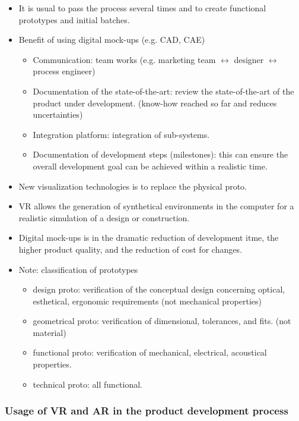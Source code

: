 \documentclass{standalone}
\begin{document}
\begin{itemize}
	\item It is usual to pass the process several times and to create functional prototypes and initial batches.
	\item Benefit of using digital mock-ups (e.g. CAD, CAE)
		\begin{itemize}
			\item Communication: team works (e.g. marketing team $\leftrightarrow$ designer $\leftrightarrow$ process engineer)
			\item Documentation of the state-of-the-art: review the state-of-the-art of the product under development. (know-how reached so far and reduces uncertainties)
			\item Integration platform: integration of sub-systems. 
			\item Documentation of development steps (milestones): this can ensure the overall development goal can be achieved within a realistic time. 
		\end{itemize}
	\item New visualization technologies is to replace the physical proto. 
	\item VR allows the generation of synthetical environments in the computer for a realistic simulation of a design or construction.
	\item Digital mock-ups is in the dramatic reduction of development itme, the higher product quality, and the reduction of cost for changes.
\end{itemize}

\begin{itemize}
	\item Note: classification of prototypes
		\begin{itemize}
			\item design proto: verification of the conceptual design concerning optical, esthetical, ergonomic requirements (not mechanical properties)
			\item geometrical proto: verification of dimensional, tolerances, and fits. (not material)
			\item functional proto: verification of mechanical, electrical, acoustical properties.
			\item technical proto: all functional. 
		\end{itemize}
\end{itemize}



\subsubsection*{Usage of VR and AR in the product development process}
\end{document}
